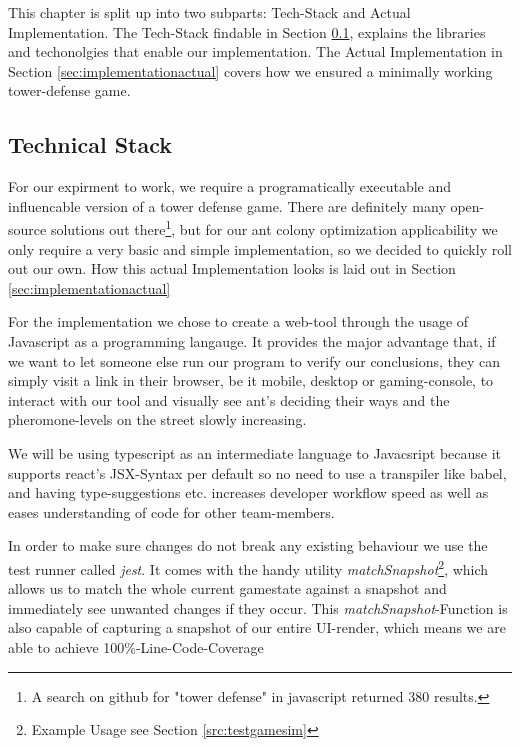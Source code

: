 This chapter is split up into two subparts: Tech-Stack and Actual Implementation. The Tech-Stack findable in Section \ref{sec:implementationtech}, explains the libraries and techonolgies that enable our implementation. The Actual Implementation in Section \ref{sec:implementationactual} covers how we ensured a minimally working tower-defense game.

\subsection{Technical Stack}
\label{sec:implementationtech}
For our expirment to work, we require a programatically executable and influencable version of a tower defense game. There are definitely many open-source solutions out there\footnote{A search on github for "tower defense" in javascript returned 380 results.\cite{githubtowerdef}}, but for our ant colony optimization applicability we only require a very basic and simple implementation, so we decided to quickly roll out our own. How this actual Implementation looks is laid out in Section \ref{sec:implementationactual}

For the implementation we chose to create a web-tool through the usage of Javascript as a programming langauge. It provides the major advantage that, if we want to let someone else run our program to verify our conclusions, they can simply visit a link in their browser, be it mobile, desktop or gaming-console, to interact with our tool and visually see ant's deciding their ways and the pheromone-levels on the street slowly increasing\cite{curran2012future}.

We will be using typescript\cite{libstypescript} as an intermediate language to Javacsript because it supports react's JSX-Syntax per default so no need to use a transpiler like babel, and having type-suggestions etc. increases developer workflow speed as well as eases understanding of code for other team-members.

In order to make sure changes do not break any existing behaviour we use the test runner called \textit{jest}\cite{libsjest}. It comes with the handy utility  \textit{matchSnapshot}\footnote{Example Usage see Section \ref{src:testgamesim}}, which allows us to match the whole current gamestate against a snapshot and immediately see unwanted changes if they occur. This \textit{matchSnapshot}-Function is also capable of capturing a snapshot of our entire UI-render, which means we are able to achieve 100\%-Line-Code-Coverage

